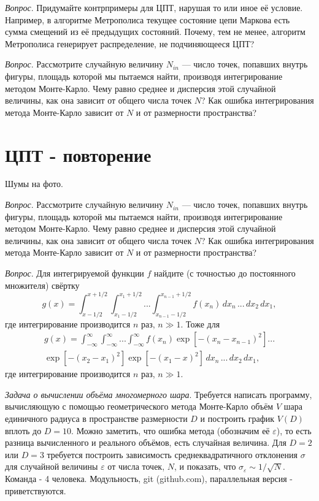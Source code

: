 \documentclass{book}
\begin{document}
\textit{Вопрос}. Придумайте контрпримеры для ЦПТ, нарушая то или иное её условие. Например, в
алгоритме Метрополиса текущее состояние цепи Маркова есть сумма смещений из её предыдущих
состояний. Почему, тем не менее, алгоритм Метрополиса генерирует распределение, не подчиняющееся
ЦПТ?

\textit{Вопрос}. Рассмотрите случайную величину $N_{in}$ --- число точек, попавших внутрь фигуры,
площадь которой мы пытаемся найти, производя интегрирование методом Монте-Карло. Чему равно среднее
и дисперсия этой случайной величины, как она зависит от общего числа точек $N$? Как ошибка
интегрирования метода Монте-Карло зависит от $N$ и от размерности пространства?

\section{ЦПТ - повторение}

Шумы на фото.

\textit{Вопрос}. Рассмотрите случайную величину $N_{in}$ --- число точек, попавших внутрь фигуры,
площадь которой мы пытаемся найти, производя интегрирование методом Монте-Карло. Чему равно среднее
и дисперсия этой случайной величины, как она зависит от общего числа точек $N$? Как ошибка
интегрирования метода Монте-Карло зависит от $N$ и от размерности пространства?

\textit{Вопрос}. Для интегрируемой функции $f$ найдите (с точностью до постоянного множителя) свёртку
\begin{equation}
    g(x) = \int_{x - 1/2}^{x + 1/2} \int_{x_1 - 1/2}^{x_1 + 1/2} ... \int_{x_{n - 1} -
    1/2}^{x_{n - 1} + 1/2}
    f(x_n) \, dx_n \,
    ... \, dx_2 \, dx_1,
\end{equation}
где интегрирование производится $n$ раз, $n \gg 1$. Тоже для
\begin{multline}
    g(x) = \int_{-\infty}^\infty \int_{-\infty}^\infty ... \int_{-\infty}^\infty
    f(x_n) \exp\left[-(x_n - x_{n - 1})^2 \right] ...\\
    \exp\left[-(x_2 - x_1)^2 \right]
    \exp\left[-(x_1 - x)^2 \right]
    \, dx_n \, ... \, dx_2 \, dx_1,
\end{multline}
где интегрирование производится $n$ раз, $n \gg 1$.

\textit{Задача о вычислении объёма многомерного шара}. Требуется написать программу, вычисляющую с
помощью геометрического метода Монте-Карло объём $V$ шара единичного радиуса в пространстве
размерности $D$ и построить график $V(D)$ вплоть до $D = 10$. Можно заметить, что ошибка метода
(обозначим её $\varepsilon$), то есть разница вычисленного и реального объёмов, есть случайная
величина. Для $D = 2$ или $D = 3$ требуется построить зависимость среднеквадратичного отклонения
$\sigma$ для случайной величины $\varepsilon$ от числа точек, $N$, и показать, что
$\sigma_\varepsilon \sim 1 / \sqrt{N}$. Команда - 4 человека. Модульность, git (github.com),
параллельная версия - приветствуются.
\end{document}
